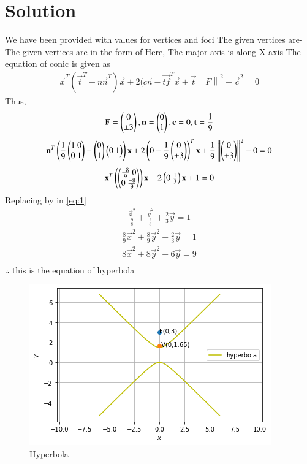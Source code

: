 \documentclass[journal,12pt,twocolumn]{IEEEtran}
\newcommand{\norm}[1]{\left\lVert#1\right\rVert}
\begin{document}
\section{Solution}
We have been provided with values for vertices and foci
\newline
The given vertices are- 
\newline
The given vertices are in the form of 
Here, The major axis is along X axis
\newline
The equation of conic is given as 
\begin{align*}
\vec{x}^T(\vec{t}^T-\vec{nn}^T) \vec{x}+2(\vec{cn}-\vec{tf}^T\vec{x}+\vec{t}\norm{F}^2-\vec{c}^2=0
\end{align*}
Thus,
\begin{align}
\mathbf{F}=\begin{pmatrix}0\\\pm 3\end{pmatrix}, \mathbf{n}= \begin{pmatrix}0\\1\end{pmatrix},\mathbf{c}=0, \mathbf{t}=\frac{1}{9}
\end{align}
\begin{align}\label{eq:1}
\vec{n}^T\brak{\frac{1}{9}\myvec{1\ 0\\ 0\ 1}-\myvec{0\\1}\myvec{0\ 1}}\vec{x}+2\brak{0-\frac{1}{9}\myvec{0\\\pm3}}^T\vec{x}+\frac{1}{9}\norm{\myvec{0\\\pm3}}^2-0=0
\end{align}
\begin{align}
\vec{x}^T\brak{\myvec{\frac{-8}{9}\ 0 \\ 0\ \frac{-8}{9}}}\vec{x}+2\myvec{0 \ \frac{1}{3}}\vec{x}+1=0
\end{align}
Replacing  by  in \eqref{eq:1}
\begin{align}
\frac{\vec{x}^2}{\frac{9}{8}}+\frac{\vec{y}^2}{\frac{9}{8}}+\frac{2}{3}\vec{y}=1
\end{align}
\begin{align}
\frac{8}{9}\vec{x}^2+\frac{8}{9}\vec{y}^2+\frac{2}{3}\vec{y}=1
\end{align}
\begin{align}
 8\vec{x}^2+8\vec{y}^2+6\vec{y}=9\\
\end{align}
$\therefore$ this is the equation of hyperbola 
\begin{figure}[ht]
\centering
\includegraphics[width=\columnwidth]{download.png}
\caption{Hyperbola}
\label{Hyperbola along given axis}
\end{figure}
\end{document}
